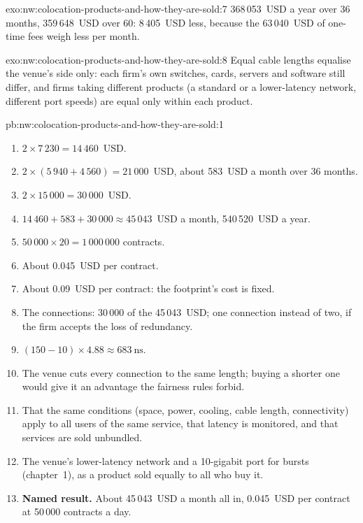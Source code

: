 \begin{solution}{exo:nw:colocation-products-and-how-they-are-sold:7}
368\,053~USD a year over 36 months, 359\,648~USD over 60: 8\,405~USD less, because the 63\,040~USD of one-time fees weigh less per month.
\end{solution}

\begin{solution}{exo:nw:colocation-products-and-how-they-are-sold:8}
Equal cable lengths equalise the venue's side only: each firm's own switches, cards, servers and software still differ, and firms taking
different products (a standard or a lower-latency network, different port speeds) are equal only within each product.
\end{solution}

\begin{solution}{pb:nw:colocation-products-and-how-they-are-sold:1}
\begin{enumerate}
\item $2 \times 7\,230 = 14\,460$~USD.
\item $2 \times (5\,940 + 4\,560) = 21\,000$~USD, about 583~USD a month over 36 months.
\item $2 \times 15\,000 = 30\,000$~USD.
\item $14\,460 + 583 + 30\,000 \approx 45\,043$~USD a month, 540\,520~USD a year.
\item $50\,000 \times 20 = 1\,000\,000$ contracts.
\item About 0.045~USD per contract.
\item About 0.09~USD per contract: the footprint's cost is fixed.
\item The connections: 30\,000 of the 45\,043~USD; one connection instead of two, if the firm accepts the loss of redundancy.
\item $(150 - 10) \times 4.88 \approx \qty{683}{\nano\second}$.
\item The venue cuts every connection to the same length; buying a shorter one would give it an advantage the fairness rules forbid.
\item That the same conditions (space, power, cooling, cable length, connectivity) apply to all users of the same service, that latency is
  monitored, and that services are sold unbundled.
\item The venue's lower-latency network and a 10-gigabit port for bursts (chapter~1), as a product sold equally to all who buy it.
\item \textbf{Named result.} About 45\,043~USD a month all in, 0.045~USD per contract at 50\,000 contracts a day.

\end{enumerate}
\end{solution}
